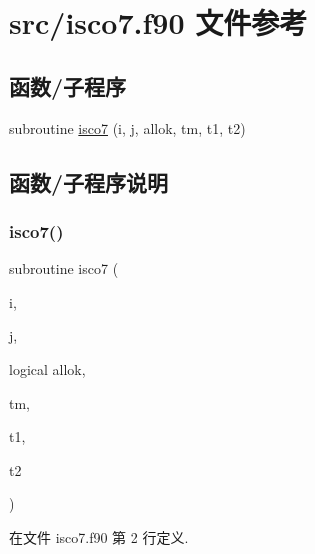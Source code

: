 \hypertarget{isco7_8f90}{}\section{src/isco7.f90 文件参考}
\label{isco7_8f90}
\subsection*{函数/子程序}
\begin{DoxyCompactItemize}
\item 
subroutine \mbox{\hyperlink{isco7_8f90_a59d430ea54e1fadc81597a8b8b37d87a}{isco7}} (i, j, allok, tm, t1, t2)
\end{DoxyCompactItemize}


\subsection{函数/子程序说明}
\mbox{\label{isco7_8f90_a59d430ea54e1fadc81597a8b8b37d87a}} 
\subsubsection{\texorpdfstring{isco7()}{isco7()}}
{\footnotesize\ttfamily subroutine isco7 (\begin{DoxyParamCaption}\item[{}]{i,  }\item[{}]{j,  }\item[{logical}]{allok,  }\item[{}]{tm,  }\item[{}]{t1,  }\item[{}]{t2 }\end{DoxyParamCaption})}



在文件 isco7.\+f90 第 2 行定义.

